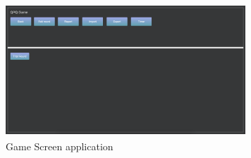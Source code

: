 \begin{figure}[!h]
\begin{center}
\includegraphics[width=9cm, height=5cm]{figures/gameScreen}
\end{center}
\caption{Game Screen application}
\label{fig:gameScreen}
\end{figure}
